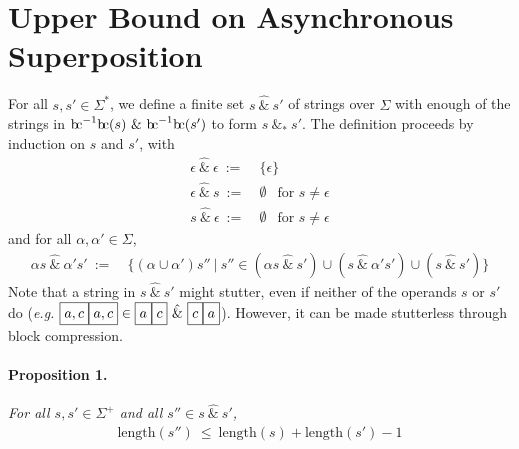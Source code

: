\documentclass[a4paper,11pt,leqno]{article}
\newcommand{\bc}{{\rm b\!c}}
\newcommand{\vph}[1]{\vphantom{#1}}
\newcommand{\ebox}[1]{\fbox{$\vph{',}#1$}}
\begin{document}
\section{Upper Bound on Asynchronous Superposition}\label{upper}
For all $s,s'\in \Sigma^{\ast}$, we define a finite set
$s~\hat{\&}~s'$ of strings over $\Sigma$ with enough of 
the strings in $\bc^{-1}\bc(s)~\&~\bc^{-1}\bc(s')$
to form $s~\&_*~s'$.
The definition proceeds by induction on $s$ and $s'$, with
\begin{subequations}
\begin{align}
\epsilon\ \hat{\&}\ \epsilon \ :=& \ \{\epsilon\}\\
\epsilon\ \hat{\&}\ s \ :=& \ \emptyset\ \ \mbox{ for } s\neq\epsilon\\
s\ \hat{\&}\ \epsilon \ :=& \ \emptyset\ \ \mbox{ for } s\neq\epsilon
\end{align}
\end{subequations}
and for all $\alpha,\alpha'\in \Sigma$,
\begin{align}
\alpha s~\hat{\&}~\alpha's' \ :=&~\{(\alpha\cup\alpha')s''\ | \ s''\in (\alpha 
s~\hat{\&}~s') \cup 
(s~\hat{\&}~\alpha's') \cup (s~\hat{\&}~s')\}
\end{align}
Note that a string in $s\ \hat{\&}\ s'$ might stutter, even if neither of the 
operands $s$ or $s'$ do
(\textit{e.g.} $\ebox{a,c}\ebox{a,c}\in
\ebox{a}\ebox{c}\ \hat{\&}\ 
\ebox{c}\ebox{a}$). However, it can be made stutterless through block 
compression.
\paragraph{Proposition 1.} {\sl For all  $s, s' \in \Sigma^+$
	and all $s''\in s\ \hat{\&}\ s'$,}
\begin{align}
\mbox{length}(s'')\ \leq\ \mbox{length}(s) + \mbox{length}(s') -1
\end{align}
\end{document}
